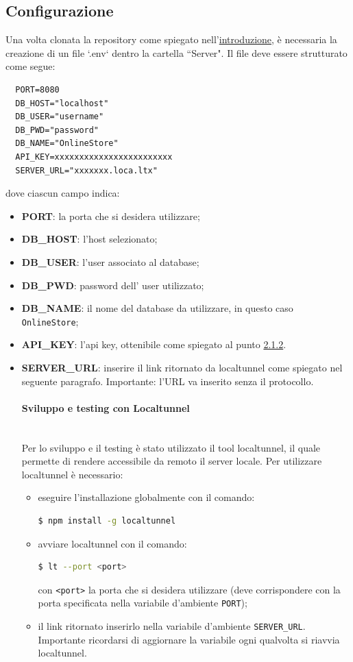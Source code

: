 \documentclass[a4paper, 12pt]{article}
\begin{document}
\subsection{Configurazione}
\label{sec:config_server}
Una volta clonata la repository come spiegato nell'\hyperref[sec:intro]{introduzione}, è necessaria la creazione di un file `.env` dentro la cartella ``Server". Il file deve essere strutturato come segue:
\begin{verbatim}
  PORT=8080
  DB_HOST="localhost"
  DB_USER="username"
  DB_PWD="password"
  DB_NAME="OnlineStore"
  API_KEY=xxxxxxxxxxxxxxxxxxxxxxxx
  SERVER_URL="xxxxxxx.loca.ltx"
\end{verbatim}
dove ciascun campo indica:
\begin{itemize}
  \item \textbf{PORT}: la porta che si desidera utilizzare;
  \item \textbf{DB\_HOST}: l'host selezionato;
  \item \textbf{DB\_USER}: l'user associato al database;
  \item \textbf{DB\_PWD}: password dell' user utilizzato;
  \item \textbf{DB\_NAME}: il nome del database da utilizzare, in questo caso \texttt{OnlineStore};
  \item \textbf{API\_KEY}: l'api key, ottenibile come spiegato al punto \hyperref[sec:provider]{2.1.2}.
  \mbox{}
  \item \textbf{SERVER\_URL}: inserire il link ritornato da localtunnel come spiegato nel seguente paragrafo. Importante: l'URL va inserito senza il protocollo.\\
  \paragraph{Sviluppo e testing con Localtunnel}\\
  Per lo sviluppo e il testing è stato utilizzato il tool localtunnel, il quale permette di rendere accessibile da remoto il server locale. Per utilizzare localtunnel è necessario:
  \begin{itemize}
    \item eseguire l'installazione globalmente con il comando:
    \begin{lstlisting}[language=bash]
      $ npm install -g localtunnel
    \end{lstlisting}
    \item avviare localtunnel con il comando:
    \begin{lstlisting}[language=bash]
      $ lt --port <port>
    \end{lstlisting}
    con \verb|<port>| la porta che si desidera utilizzare (deve corrispondere con la porta specificata nella variabile d'ambiente \verb|PORT|);\\
    \item il link ritornato inserirlo nella variabile d'ambiente \verb|SERVER_URL|. Importante ricordarsi di aggiornare la variabile ogni qualvolta si riavvia localtunnel.
  \end{itemize}

\end{itemize}
\end{document}
